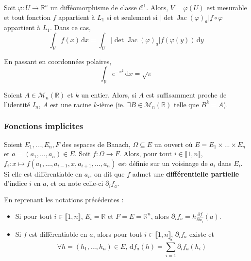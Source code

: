 	\begin{application}
		Soit $\varphi : U \rightarrow \mathbb{R}^n$ un difféomorphisme de classe $\mathcal{C}^1$. Alors, $V = \varphi(U)$ est mesurable et tout fonction $f$ appartient à $L_1$ si et seulement si $\vert \det \operatorname{Jac}(\varphi)_a \vert f \circ \varphi$ appartient à $L_1$. Dans ce cas,
		\[ \int_V f(x) \, \mathrm{d}x = \int_U \vert \det \operatorname{Jac}(\varphi)_a \vert f (\varphi(y)) \, \mathrm{d}y \]
	\end{application}
	
	
	\begin{example}
		En passant en coordonnées polaires,
		\[ \int_{\mathbb{R}} e^{-x^2} \, \mathrm{d}x = \sqrt{\pi} \]
	\end{example}
	
	
	\begin{application}
		Soient $A \in \mathcal{M}_n(\mathbb{R})$ et $k$ un entier. Alors, si $A$ est suffisamment proche de l'identité $I_n$, $A$ est une racine $k$-ième (ie. $\exists B \in \mathcal{M}_n(\mathbb{R})$ telle que $B^k = A$).
	\end{application}
	
	\subsubsection{Fonctions implicites}
	
	
	\begin{definition}
		Soient $E_1, \dots, E_n, F$ des espaces de Banach, $\Omega \subseteq E$ un ouvert où $E = E_1 \times \dots \times E_n$ et $a = (a_1, \dots, a_n) \in E$. Soit $f : \Omega \rightarrow F$. Alors, pour tout $i \in \llbracket 1, n \rrbracket$, $f_i : x \mapsto f(a_1, \dots, a_{i-1}, x, a_{i+1}, \dots, a_n)$ est définie sur un voisinage de $a_i$ dans $E_i$. Si elle est différentiable en $a_i$, on dit que $f$ admet une \textbf{différentielle partielle} d'indice $i$ en $a$, et on note celle-ci $\partial_i f_a$.
	\end{definition}
	
	\begin{remark}
		En reprenant les notations précédentes :
		\begin{itemize}
			\item Si pour tout $i \in \llbracket 1, n \rrbracket$, $E_i = \mathbb{R}$ et $F = E = \mathbb{R}^n$, alors $\partial_i f_a = h \frac{\partial f}{\partial x_i} (a)$.
			\item Si $f$ est différentiable en $a$, alors pour tout $i \in \llbracket 1, n \rrbracket$, $\partial_i f_a$ existe et
			\[ \forall h = (h_1, \dots, h_n) \in E, \, \mathrm{d}f_a(h) = \sum_{i=1}^{n} \partial_i f_a(h_i) \]
		\end{itemize}
	\end{remark}
	
